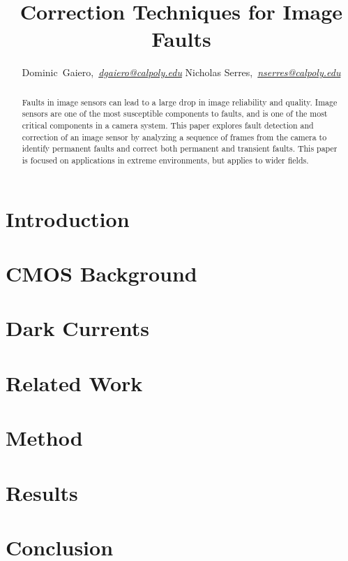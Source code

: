 \documentclass[journal]{IEEEtran}
\begin{document}
\title{Correction Techniques for Image Faults}

\author{Dominic~Gaiero,~\textit{\href{mailto:dgaiero@calpoly.edu}{dgaiero@calpoly.edu}}
    Nicholas Serres,~\textit{\href{mailto:nserres@calopoly.edu}{nserres@calpoly.edu}}}

\maketitle

\begin{abstract}
Faults in image sensors can lead to a large drop in image reliability and quality. Image sensors are one of the most susceptible components to faults, and is one of the most critical components in a camera system. This paper explores fault detection and correction of an image sensor by analyzing a sequence of frames from the camera to identify permanent faults and correct both permanent and transient faults. This paper is focused on applications in extreme environments, but applies to wider fields. 
\end{abstract}

\section{Introduction}

\section{CMOS Background}

\section{Dark Currents}

\section{Related Work} 

\section{Method}

\section{Results}

\section{Conclusion}



{\footnotesize

}
\end{document}
